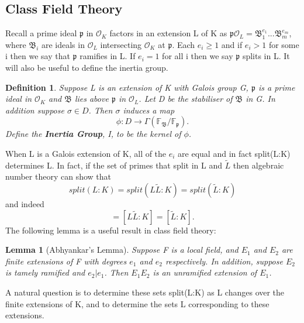 \documentclass[preprint,12pt,reqno]{elsarticle}
\newtheorem{lemma}[theorem]{Lemma}
\newtheorem{definition}{Definition}
\begin{document}
\subsection{Class Field Theory}

Recall a prime ideal $\mathfrak{p}$ in $\mathcal{O}_K$ factors in an extension L of K as
\newline
$\mathfrak{p}\mathcal{O}_L=\mathfrak{B}_1^{e_1}...\mathfrak{B}_m^{e_m}$, where $\mathfrak{B}_i$ are ideals in $\mathcal{O}_L$ intersecting $\mathcal{O}_K$ at $\mathfrak{p}$. Each $e_i\geq1$ and if $e_i>1$ for some i then we say that $\mathfrak{p}$ ramifies in L. If $e_i=1$ for all i then we say $\mathfrak{p}$ splits in L.
\newline
It will also be useful to define the inertia group.\begin{definition}
 Suppose L is an extension of K with Galois group G, $\mathfrak{p}$ is a prime ideal in $\mathcal{O}_K$ and $\mathfrak{B}$ lies above $\mathfrak{p}$ in $\mathcal{O}_L$. Let D be the stabiliser of $\mathfrak{B}$ in G. In addition suppose $\sigma \in D$. Then $\sigma$ induces a map \begin{equation}
     \phi :D\longrightarrow\Gamma(\mathbb{F}_\mathfrak{B}/\mathbb{F}_\mathfrak{p}).
 \end{equation}
 Define the \textbf{Inertia Group}, I, to be the kernel of $\phi$.
\end{definition}
When L is a Galois extension of K, all of the $e_i$ are equal and in fact split(L:K) determines L.
\newline
In fact, if the set of primes that split in L and $\tilde{L}$ then algebraic number theory can show that
\begin{equation}
 split(L:K)=split(L\tilde{L}:K)=split(\tilde{L}:K)
\end{equation}
 and indeed 
 \begin{equation}
 [L:K]=[L\tilde{L}:K]=[\tilde{L}:K].
 \end{equation}
 The following lemma is a useful result in class field theory:
 \begin{lemma}[Abhyankar's Lemma]
    Suppose F is a local field, and $E_1$ and $E_2$ are finite extensions of F with degrees $e_1$ and $e_2$ respectively. In addition, suppose $E_2$ is tamely ramified and $e_2|e_1$. Then $E_1E_2$ is an unramified extension of $E_1$.
 \end{lemma}
A natural question is to determine these sets split(L:K) as L changes over the finite extensions of K, and to determine the sets L corresponding to these extensions.
\end{document}
